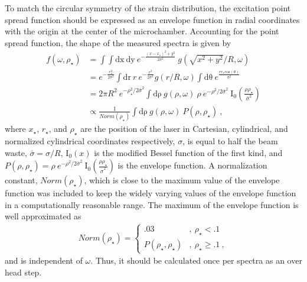 To match the circular symmetry of the strain distribution, the excitation point spread function should be expressed as an envelope function in radial coordinates with the origin at the center of the microchamber.
Accounting for the point spread function, the shape of the measured spectra is given by
\begin{align*}
	f(\omega,\rho_{\star})&=
		\int \int \mathrm{dx} \ \mathrm{dy} \ e^{-\frac{(x-x_{\star})^2+y^2}{2 \sigma^2}} \ g(\sqrt{x^2+y^2}/R,\omega) \\
	&=e^{-\frac{r_{\star}^2}{2 \sigma^2}} \int  \mathrm{dr} \ r \ e^{-\frac{r^2}{2 \sigma^2}} g(r/R,\omega) 
		\int \mathrm{d \theta} \ e^{\frac{r r_{\star} \mathrm{cos}(\theta)}{\sigma^2}} \\
	&=2\pi R^2 \ e^{-\rho_{\star}^2/2 \bar{\sigma}^2} \int \mathrm{d \rho} \ g(\rho,\omega) \
		\rho \ e^{-\rho^2/2 \bar{\sigma}^2} \
		\mathrm{I}_{0} \left( \frac{\rho \rho_{\star}}{\bar{\sigma}^2} \right) \\
	&\propto \frac{1}{Norm(\rho_{\star})} \int \mathrm{d \rho} \ g(\rho,\omega) \ P(\rho,\rho_{\star}) \ ,
\end{align*}
where $x_{\star}$, $r_{\star}$, and $\rho_{\star}$ are the position of the laser in Cartesian, cylindrical, and normalized cylindrical coordinates respectively, $\sigma$, is equal to half the beam waste, $\bar{\sigma}=\sigma/R$, $\mathrm{I}_0(x)$ is the modified Bessel function of the first kind, and $P(\rho,\rho_{\star})=\rho \ e^{-\rho^2/2 \bar{\sigma}^2} \ \mathrm{I}_0 \left( \frac{\rho \rho_{\star}}{\bar{\sigma}^2} \right)$ is the envelope function.
A normalization constant, $Norm(\rho_{\star})$, which is close to the maximum value of the envelope function was included to keep the widely varying values of the envelope function in a computationally reasonable range.
The maximum of the envelope function is well approximated as
\begin{align*}
	Norm(\rho_{\star})=
		\begin{cases}
			.03 							& , \ \rho_{\star} <    .1 \\
			P(\rho_{\star}, \rho_{\star})	& , \ \rho_{\star} \geq .1 \ ,
		\end{cases}
\end{align*}
and is independent of $\omega$.
Thus, it should be calculated once per spectra as an over head step.

